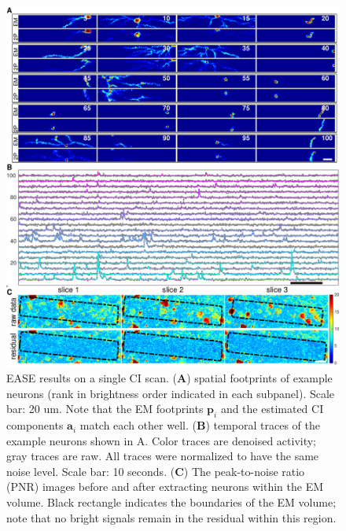 \documentclass[10pt,letterpaper]{article}
\begin{document}
\begin{figure}[t!]
	\centering
	\includegraphics[width=1\textwidth]{Figs/fig_example_scan_1.pdf}
	\caption{EASE results on a single CI scan. (\textbf{A}) spatial footprints of example neurons (rank in brightness order indicated in each subpanel). Scale bar: 20 um.  Note that the EM footprints $\bm{p}_i$ and the estimated CI components $\bm{a}_i$ match each other well.  (\textbf{B}) temporal traces of the example neurons shown in A. Color traces are denoised activity; gray traces are raw.  All traces were normalized to have the same noise level. Scale bar: 10 seconds. (\textbf{C}) The peak-to-noise ratio (PNR) images before and after extracting neurons within the EM volume. Black rectangle indicates the boundaries of the EM volume;  note that no bright signals remain in the residual within this region.}
\label{fig:cn_pnr}
\end{figure}
\end{document}
